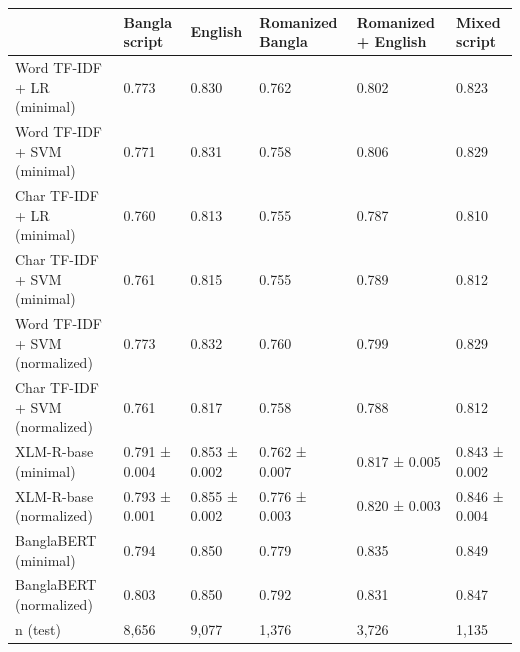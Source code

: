 \begin{tabular}{llllll}
\toprule
 & Bangla script & English & Romanized Bangla & Romanized + English & Mixed script \\
\midrule
Word TF-IDF + LR (minimal) & 0.773 & 0.830 & 0.762 & 0.802 & 0.823 \\
Word TF-IDF + SVM (minimal) & 0.771 & 0.831 & 0.758 & 0.806 & 0.829 \\
Char TF-IDF + LR (minimal) & 0.760 & 0.813 & 0.755 & 0.787 & 0.810 \\
Char TF-IDF + SVM (minimal) & 0.761 & 0.815 & 0.755 & 0.789 & 0.812 \\
Word TF-IDF + SVM (normalized) & 0.773 & 0.832 & 0.760 & 0.799 & 0.829 \\
Char TF-IDF + SVM (normalized) & 0.761 & 0.817 & 0.758 & 0.788 & 0.812 \\
XLM-R-base (minimal) & 0.791 ± 0.004 & 0.853 ± 0.002 & 0.762 ± 0.007 & 0.817 ± 0.005 & 0.843 ± 0.002 \\
XLM-R-base (normalized) & 0.793 ± 0.001 & 0.855 ± 0.002 & 0.776 ± 0.003 & 0.820 ± 0.003 & 0.846 ± 0.004 \\
BanglaBERT (minimal) & 0.794 & 0.850 & 0.779 & 0.835 & 0.849 \\
BanglaBERT (normalized) & 0.803 & 0.850 & 0.792 & 0.831 & 0.847 \\
n (test) & 8,656 & 9,077 & 1,376 & 3,726 & 1,135 \\
\bottomrule
\end{tabular}
